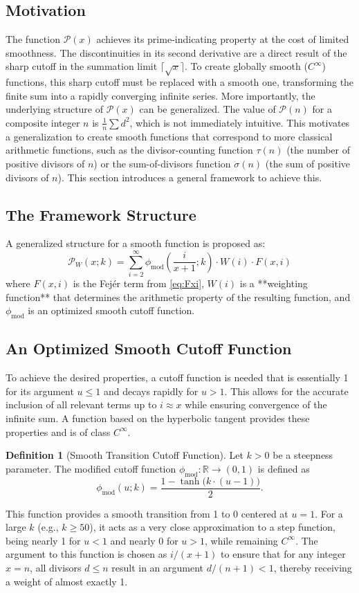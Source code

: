 \documentclass[11pt,a4paper]{amsart}
\newcommand{\Px}{\mathcal{P}}
\newcommand{\R}{\mathbb{R}}
\theoremstyle{plain}
\theoremstyle{definition}
\newtheorem{definition}[theorem]{Definition}
\begin{document}
\subsection{Motivation}
The function $\Px(x)$ achieves its prime-indicating property at the cost of limited smoothness.
The discontinuities in its second derivative are a direct result of the sharp cutoff in the summation limit $\lceil\sqrt{x}\rceil$.
To create globally smooth ($C^\infty$) functions, this sharp cutoff must be replaced with a smooth one, transforming the finite sum into a rapidly converging infinite series.
More importantly, the underlying structure of $\Px(x)$ can be generalized.
The value of $\Px(n)$ for a composite integer $n$ is $\frac{1}{n}\sum d^2$, which is not immediately intuitive.
This motivates a generalization to create smooth functions that correspond to more classical arithmetic functions, such as the divisor-counting function $\tau(n)$ (the number of positive divisors of $n$) or the sum-of-divisors function $\sigma(n)$ (the sum of positive divisors of $n$).
This section introduces a general framework to achieve this.

\subsection{The Framework Structure}
A generalized structure for a smooth function is proposed as:
\[ \Px_W(x; k) = \sum_{i=2}^{\infty} \phi_{\text{mod}}\left(\frac{i}{x+1}; k\right) \cdot W(i) \cdot F(x,i) \]
where $F(x,i)$ is the Fejér term from \eqref{eq:Fxi}, $W(i)$ is a **weighting function** that determines the arithmetic property of the resulting function, and $\phi_{\text{mod}}$ is an optimized smooth cutoff function.
\subsection{An Optimized Smooth Cutoff Function}
To achieve the desired properties, a cutoff function is needed that is essentially 1 for its argument $u \le 1$ and decays rapidly for $u > 1$.
This allows for the accurate inclusion of all relevant terms up to $i \approx x$ while ensuring convergence of the infinite sum.
A function based on the hyperbolic tangent provides these properties and is of class $C^\infty$.
\begin{definition}[Smooth Transition Cutoff Function]
Let $k>0$ be a steepness parameter. The modified cutoff function $\phi_{\text{mod}}\colon\R\to(0,1)$ is defined as
\begin{equation}\label{eq:phimod}
\phi_{\text{mod}}(u; k) = \frac{1 - \tanh\big(k \cdot (u - 1)\big)}{2}.
\end{equation}
\end{definition}
This function provides a smooth transition from 1 to 0 centered at $u=1$.
For a large $k$ (e.g., $k \ge 50$), it acts as a very close approximation to a step function, being nearly 1 for $u<1$ and nearly 0 for $u>1$, while remaining $C^\infty$.
The argument to this function is chosen as $i/(x+1)$ to ensure that for any integer $x=n$, all divisors $d \le n$ result in an argument $d/(n+1) < 1$, thereby receiving a weight of almost exactly 1.
\end{document}
